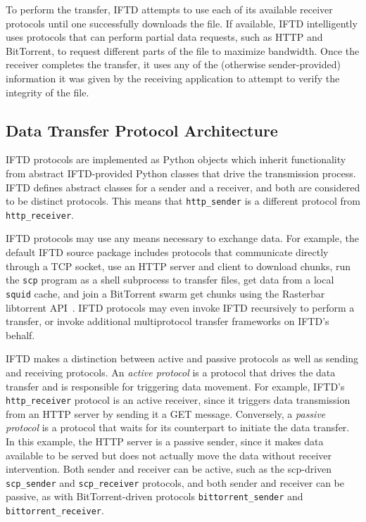 To perform the transfer, IFTD attempts to use each of its available receiver protocols until one successfully downloads the file.  If available, IFTD intelligently uses protocols that can perform partial data requests, such as HTTP and BitTorrent, to request different parts of the file to maximize bandwidth.  Once the receiver completes the transfer, it uses any of the (otherwise sender-provided) information it was given by the receiving application to attempt to verify the integrity of the file.

\subsection{Data Transfer Protocol Architecture}

IFTD protocols are implemented as Python objects which inherit functionality from abstract IFTD-provided Python classes that drive the transmission process.  IFTD defines abstract classes for a sender and a receiver, and both are considered to be distinct protocols.  This means that \texttt{http\_sender} is a different protocol from \texttt{http\_receiver}.

IFTD protocols may use any means necessary to exchange data.  For example, the default IFTD source package includes protocols that communicate directly through a TCP socket, use an HTTP server and client to download chunks, run the \texttt{scp} program as a shell subprocess to transfer files, get data from a local \texttt{squid} cache, and join a BitTorrent swarm get chunks using the Rasterbar libtorrent API~\cite{libtorrent}.  IFTD protocols may even invoke IFTD recursively to perform a transfer, or invoke additional multiprotocol transfer frameworks on IFTD's behalf.

IFTD makes a distinction between active and passive protocols as well as sending and receiving protocols.  An \textit{active protocol} is a protocol that drives the data transfer and is responsible for triggering data movement.  For example, IFTD's \texttt{http\_receiver} protocol is an active receiver, since it triggers data transmission from an HTTP server by sending it a GET message.  Conversely, a \textit{passive protocol} is a protocol that waits for its counterpart to initiate the data transfer.  In this example, the HTTP server is a passive sender, since it makes data available to be served but does not actually move the data without receiver intervention.  Both sender and receiver can be active, such as the scp-driven \texttt{scp\_sender} and \texttt{scp\_receiver} protocols, and both sender and receiver can be passive, as with BitTorrent-driven protocols \texttt{bittorrent\_sender} and \texttt{bittorrent\_receiver}.

